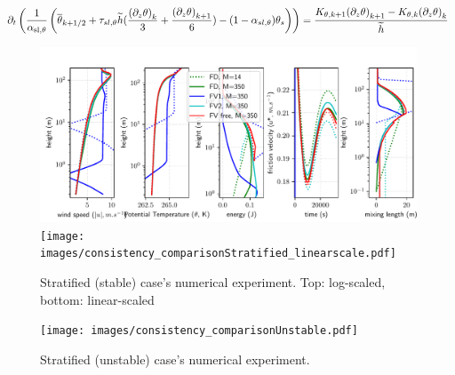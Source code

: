 \begin{equation}
	\label{eq:ND_StratifiedCase_semiDiscreteEkmanEqPTFVfree}
	\partial_t \left(\frac{1}{\alpha_{\rm sl, \theta}}
	\left(
	\overline{\theta}_{k+1/2} + \tau_{sl, \theta}
	\widetilde{h}(\frac{{(\partial_z \theta)}_k}{3} +
	\frac{{(\partial_z \theta)}_{k+1}}{6})
	 - (1 - \alpha_{sl, \theta})\theta_s
	\right) \right)
	= \frac{K_{\theta, k+1}{(\partial_z \theta)}_{k+1} -
	K_{\theta,k} {(\partial_z \theta)}_k}{\widetilde{h}}
\end{equation}

\begin{figure}
	\centering
	\includegraphics[scale=0.55]{images/consistency_comparisonStratified.pdf}
	\texttt{[image: images/consistency\_comparisonStratified\_linearscale.pdf]}
	\caption{Stratified (stable) case's numerical experiment. Top: log-scaled, bottom: linear-scaled}
	\label{fig:ND_StratifiedCase_NumericalExpStable}
\end{figure}
\begin{figure}
	\centering
	\texttt{[image: images/consistency\_comparisonUnstable.pdf]}
	\caption{Stratified (unstable) case's numerical experiment.}
	\label{fig:ND_StratifiedCase_NumericalExpUnstable}
\end{figure}

